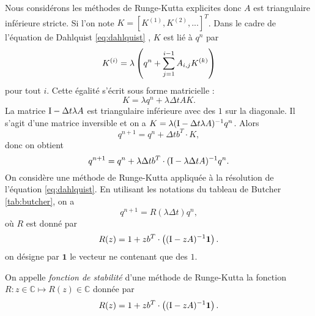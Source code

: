 Nous considérons les méthodes de Runge-Kutta explicites donc $A$ est triangulaire inférieure stricte.
Si l'on note $K = [K^{(1)}, K^{(2)}, ...]^T$. Dans le cadre de l'équation de Dahlquist \eqref{eq:dahlquist} \cite{Hairer2006}, $K$ est lié à $q^n$ par
\begin{equation}
K^{(i)} = \lambda \left( q^n + \displaystyle\sum\limits_{j=1}^{i-1} A_{i,j} K^{(k)} \right)
\end{equation}
pour tout $i$. Cette égalité s'écrit sous forme matricielle :
\begin{equation}
K = \lambda q^n +  \lambda \Delta t A K.
\end{equation}
La matrice $\text{I}-\Delta t \lambda A$ est triangulaire inférieure avec des $1$ sur la diagonale. Il s'agit d'une matrice inversible et on a $K = \lambda (\text{I}-\Delta t \lambda A)^{-1} q^n$. Alors
\begin{equation*}
q^{n+1} = q^n + \Delta t b^T \cdot K,
\end{equation*}
donc on obtient 
\begin{equation}
q^{n+1} = q^n + \lambda \Delta t b^T \cdot (\text{I} - \lambda \Delta t A)^{-1} q^n.
\end{equation} 
On considère une méthode de Runge-Kutta appliquée à la résolution de l'équation \eqref{eq:dahlquist}. En utilisant les notations du tableau de Butcher \ref{tab:butcher}, on a 
\begin{equation}
q^{n+1} = R(\lambda \Delta t) q^n,
\end{equation}
où $R$ est donné par
\begin{equation}
R(z) = 1 + z b^T \cdot \left( (\text{I} - z A)^{-1} \mathbf{1} \right).
\end{equation}
on désigne par $\mathbf{1}$ le vecteur ne contenant que des $1$.
\begin{definition}

On appelle \textit{fonction de stabilité} d'une méthode de Runge-Kutta la fonction $R : z \in \mathbb{C} \mapsto R(z) \in \mathbb{C}$ donnée par 
\begin{equation}
R(z) = 1 + z b^T \cdot \left( (\text{I} - z A)^{-1} \mathbf{1} \right).
\end{equation}
\end{definition}


